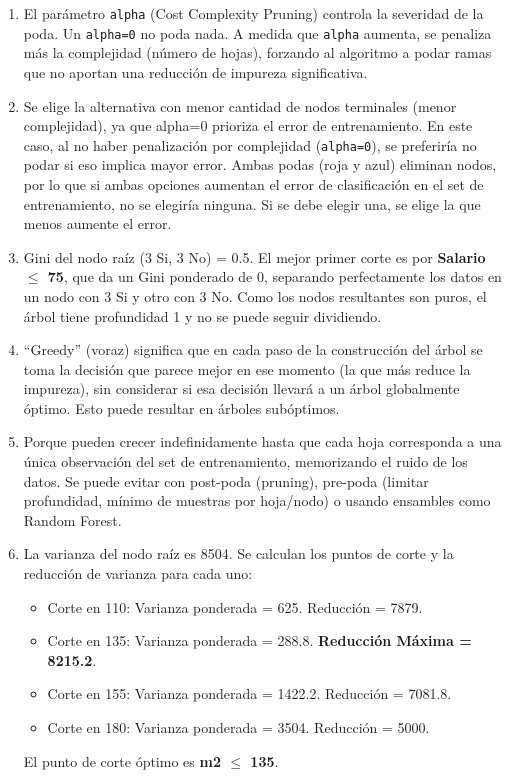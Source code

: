 \documentclass[12pt]{article}
\begin{document}
\begin{enumerate}
  \item El parámetro \texttt{alpha} (Cost Complexity Pruning) controla la severidad de la poda. Un \texttt{alpha=0} no poda nada. A medida que \texttt{alpha} aumenta, se penaliza más la complejidad (número de hojas), forzando al algoritmo a podar ramas que no aportan una reducción de impureza significativa.

  \item Se elige la alternativa con menor cantidad de nodos terminales (menor complejidad), ya que alpha=0 prioriza el error de entrenamiento. En este caso, al no haber penalización por complejidad (\texttt{alpha=0}), se preferiría no podar si eso implica mayor error. Ambas podas (roja y azul) eliminan nodos, por lo que si ambas opciones aumentan el error de clasificación en el set de entrenamiento, no se elegiría ninguna. Si se debe elegir una, se elige la que menos aumente el error.

  \item Gini del nodo raíz (3 Si, 3 No) = 0.5.
  El mejor primer corte es por \textbf{Salario \(\leq\) 75}, que da un Gini ponderado de 0, separando perfectamente los datos en un nodo con 3 Si y otro con 3 No. Como los nodos resultantes son puros, el árbol tiene profundidad 1 y no se puede seguir dividiendo.

  \item ``Greedy'' (voraz) significa que en cada paso de la construcción del árbol se toma la decisión que parece mejor en ese momento (la que más reduce la impureza), sin considerar si esa decisión llevará a un árbol globalmente óptimo. Esto puede resultar en árboles subóptimos.

  \item Porque pueden crecer indefinidamente hasta que cada hoja corresponda a una única observación del set de entrenamiento, memorizando el ruido de los datos. Se puede evitar con post-poda (pruning), pre-poda (limitar profundidad, mínimo de muestras por hoja/nodo) o usando ensambles como Random Forest.
  
  \item La varianza del nodo raíz es 8504. Se calculan los puntos de corte y la reducción de varianza para cada uno:
    \begin{itemize}
      \item Corte en 110: Varianza ponderada = 625. Reducción = 7879.
      \item Corte en 135: Varianza ponderada = 288.8. \textbf{Reducción Máxima = 8215.2}.
      \item Corte en 155: Varianza ponderada = 1422.2. Reducción = 7081.8.
      \item Corte en 180: Varianza ponderada = 3504. Reducción = 5000.
    \end{itemize}
    El punto de corte óptimo es \textbf{m2 \(\leq\) 135}.


\end{enumerate}
\end{document}
